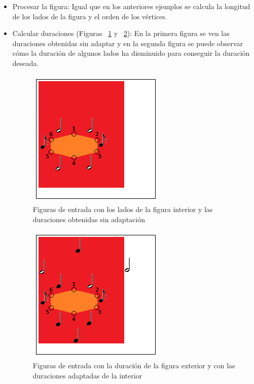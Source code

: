 \begin{itemize}

	\item Procesar la figura: Igual que en los anteriores ejemplos se calcula la longitud de los lados de la figura y el orden de los vértices.

	\item Calcular duraciones (Figuras ~\ref{fig:Figura1Voz2} y ~\ref{fig:Figura2Voz2}): En la primera figura se ven las duraciones obtenidas sin adaptar y en la segunda figura se puede observar cómo la duración de algunos lados ha disminuido para conseguir la duración deseada.

 		\begin{figure}[!htbp]
		\centering
		\hspace*{0.0in}
		\includegraphics[scale=1]{graphics/simpletest4-F2.png}
		\caption{Figuras de entrada con los lados de la figura interior y las duraciones obtenidas sin adaptación}
		\label{fig:Figura1Voz2}
		\end{figure}

		\begin{figure}[!htbp]
		\centering
		\hspace*{0.0in}
		\includegraphics[scale=1]{graphics/simpletest4-F2_2.png}
		\caption{Figuras de entrada con la duración de la figura exterior y con las duraciones adaptadas de la interior}
		\label{fig:Figura2Voz2}
		\end{figure}


\end{itemize}
